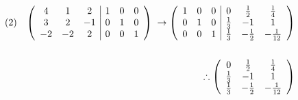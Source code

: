 \documentclass[dvipdfmx,uplatex]{jsarticle}
\begin{document}
  \begin{equation}
    \begin{aligned}
        (2)\hspace{3mm}
        \left(
            \begin{array}{ccc|ccc} 
                4 & 1 & 2 & 1 & 0 & 0 \\
                3 & 2 & -1 & 0 & 1 & 0 \\
                -2 & -2 & 2 & 0 & 0 & 1 \\
            \end{array}
        \right) \hspace{1mm} \to
        \left(
            \begin{array}{ccc|ccc}
                1 & 0 & 0 & 0 & \frac{1}{2} & \frac{1}{4} \\
                0 & 1 & 0 & \frac{1}{3} & -1 & 1 \\
                0 & 0 & 1 & \frac{1}{3} & -\frac{1}{2} & -\frac{1}{12} \\
            \end{array} 
        \right) \nonumber\\
        \\
        \therefore \left(
            \begin{array}{ccc}
                0 & \frac{1}{2} & \frac{1}{4} \\
                \frac{1}{3} & -1 & 1 \\
                \frac{1}{3} & -\frac{1}{2} & -\frac{1}{12} \\
            \end{array} 
        \right)
    \end{aligned}
  \end{equation}
\end{document}
